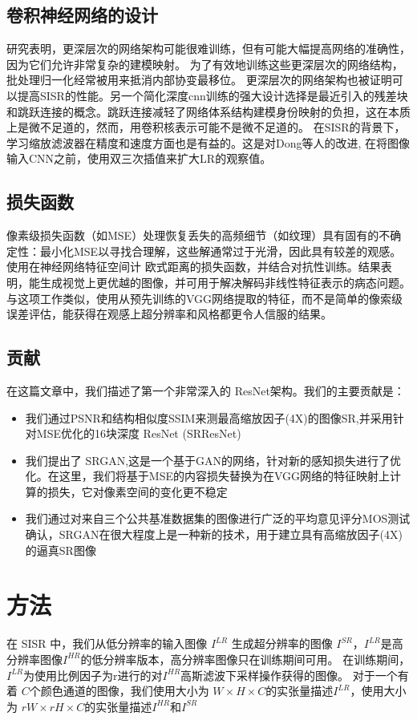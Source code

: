 \documentclass[UTF8,a4paper,10pt]{ctexart}
\begin{document}
\subsection{卷积神经网络的设计}
研究表明，更深层次的网络架构可能很难训练，但有可能大幅提高网络的准确性，因为它们允许非常复杂的建模映射。
为了有效地训练这些更深层次的网络结构，批处理归一化经常被用来抵消内部协变最移位。
更深层次的网络架构也被证明可以提高SISR的性能。另一个简化深度cnn训练的强大设计选择是最近引入的残差块和跳跃连接的概念。跳跃连接减轻了网络体系结构建模身份映射的负担，这在本质上是微不足道的，然而，用卷积核表示可能不是微不足道的。
在SISR的背景下，学习缩放滤波器在精度和速度方面也是有益的。这是对Dong等人的改进, 在将图像输入CNN之前，使用双三次插值来扩大LR的观察值。

\subsection{损失函数}
像素级损失函数（如MSE）处理恢复丢失的高频细节（如纹理）具有固有的不确定性：最小化MSE以寻找合理解，这些解通常过于光滑，因此具有较差的观感。
使用在神经网络特征空间计 欧式距离的损失函数，并结合对抗性训练。结果表明，能生成视觉上更优越的图像，并可用于解决解码非线性特征表示的病态问题。与这项工作类似，使用从预先训练的VGG网络提取的特征，而不是简单的像索级误差评估，能获得在观感上超分辨率和风格都更令人信服的结果。

\subsection{贡献}
在这篇文章中，我们描述了第一个非常深入的 ResNet架构。我们的主要贡献是：
\begin{itemize}
  \item 我们通过PSNR和结构相似度SSIM来测最高缩放因子(4X)的图像SR,并采用针对MSE优化的16块深度 ResNet (SRResNet)
  \item 我们提出了 SRGAN,这是一个基于GAN的网络，针对新的感知损失进行了优化。在这里，我们将基于MSE的内容损失替换为在VGG网络的特征映射上计算的损失，它对像素空间的变化更不稳定
  \item 我们通过对来自三个公共基准数据集的图像进行广泛的平均意见评分MOS测试确认，SRGAN在很大程度上是一种新的技术，用于建立具有高缩放因子(4X)的逼真SR图像
\end{itemize}

\section{方法}
在 SISR 中，我们从低分辨率的输入图像 $I^{LR}$ 生成超分辨率的图像 $I^{SR}$，$I^{LR}$是高分辨率图像$I^{HR}$的低分辨率版本，高分辨率图像只在训练期间可用。
在训练期间，$I^{LR}$为使用比例因子为r进行的对$I^{HR}$高斯滤波下采样操作获得的图像。
对于一个有着 $C$个颜色通道的图像，我们使用大小为 $W × H × C$的实张量描述$I^{LR}$，使用大小为 $rW × rH × C$的实张量描述$I^{HR}$和$I^{SR}$
\end{document}
